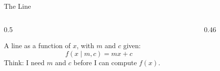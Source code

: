 \documentclass[aspectratio=169,t]{beamer}
\newcommand{\plotdata}{\addplot[data points] coordinates {(1,2) (2,3) (3,7)};}
\begin{document}
\begin{frame}{The Line}
  \begin{columns}[T,onlytextwidth]
    \begin{column}{0.5\textwidth}
    \begin{definition}
        A line as a function of \(x\), with \(m\) and \(c\) given:
        \[f(x\mid m, c) = mx + c\]
        Think: I need \(m\) and \(c\) before I can compute \(f(x)\).
    \end{definition}

    \medskip
    \end{column}
    \begin{column}{0.46\textwidth}
      \centering
    \end{column}
  \end{columns}
\end{frame}
\end{document}
